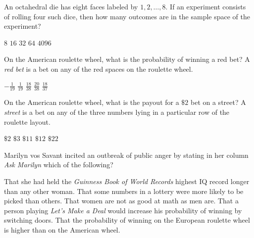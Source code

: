 \documentclass[answers,12pt]{exam}
\begin{document}
\begin{questions}
\question An octahedral die has eight faces labeled by $1,2,\ldots,8$.
If an experiment consists of rolling four such dice, then how
many outcomes are in the sample space of the experiment?\\
\begin{oneparchoices}
\choice $8$ %
\choice $16$
\choice $32$ %
\choice $64$ %
\correctchoice $4096$
\end{oneparchoices}

\question On the American roulette wheel,
what is the probability of winning a
red bet? A {\em red bet} is a bet on any of the red spaces
on the roulette wheel.\\
\begin{oneparchoices}
\choice $-\frac{1}{19}$
\choice $\frac{1}{19}$
\choice $\frac{18}{38}$
\choice $\frac{20}{38}$
\correctchoice $\frac{18}{37}$
\end{oneparchoices}

\question On the American roulette wheel, what is the payout
for a $\$2$ bet on a street? A {\em street} is a bet
on any of the three numbers lying in a particular
row of the roulette layout.\\
\begin{oneparchoices}
\choice $\$2$
\choice $\$3$
\choice $\$11$
\choice $\$12$
\correctchoice $\$22$
\end{oneparchoices}

\question Marilyn vos Savant incited an outbreak of public
anger by stating in her column {\em Ask Marilyn} which
of the following?\\
\begin{choices}
\choice That she had held the {\em Guinness Book of World Records}
highest IQ record longer than any other woman.
\choice That some numbers in a lottery were more
likely to be picked than others.
\choice That women are not as good at math as men are.
\correctchoice That a person playing {\em Let's Make a Deal}
would increase his probability of winning by switching doors.
\choice That the probability of winning on the European
roulette wheel is higher than on the American wheel.
\end{choices}



\end{questions}
\end{document}

